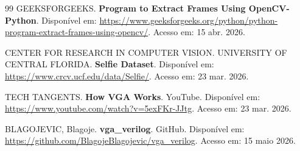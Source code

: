 \begin{thebibliography}{99}
GEEKSFORGEEKS.
\textbf{Program to Extract Frames Using OpenCV-Python}.
Disponível em:
\url{https://www.geeksforgeeks.org/python/python-program-extract-frames-using-opencv/}.
Acesso em: 15 abr. 2026.

CENTER FOR RESEARCH IN COMPUTER VISION.
UNIVERSITY OF CENTRAL FLORIDA.
\textbf{Selfie Dataset}.
Disponível em:
\url{https://www.crcv.ucf.edu/data/Selfie/}.
Acesso em: 23 mar. 2026.

TECH TANGENTS.
\textbf{How VGA Works}.
YouTube.
Disponível em:
\url{https://www.youtube.com/watch?v=5exFKr-JJtg}.
Acesso em: 23 mar. 2026.

BLAGOJEVIC, Blagoje.
\textbf{vga\_verilog}.
GitHub.
Disponível em:
\url{https://github.com/BlagojeBlagojevic/vga_verilog}.
Acesso em: 15 maio 2026.

\end{thebibliography}
